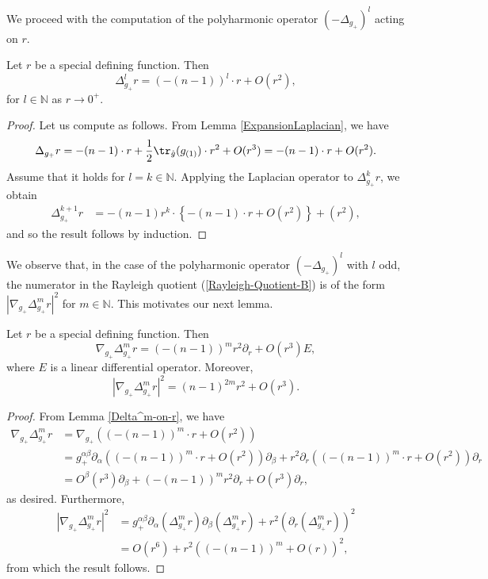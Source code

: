 \documentclass{amsart}
\newcommand{\A}{\alpha}
\newcommand{\B}{\beta}
\begin{document}
We proceed with the computation of the polyharmonic operator $(-\Delta_{g_+})^l$ acting on $r$.

\begin{lemma}\label{Delta^m-on-r}
Let $r$ be a special defining function. Then
\begin{equation}
    \Delta^l_{g_+}r =(-(n-1))^l\cdot r +O(r^2),
\end{equation}
for $l\in \mathbb{N}$ as $r\to0^+$.
\end{lemma}

\begin{proof}
    Let us compute as follows. From Lemma \ref{ExpansionLaplacian}, we have
    \[
    \Delta_{g_+}r =-(n-1)\cdot r +\frac12\tr_{\hat g}(g_{(1)})\cdot r^2 + O(r^3) = -(n-1)\cdot r + O(r^2).
    \]
    Assume that it holds for $l=k\in\mathbb{N}$. Applying the Laplacian operator to $\Delta_{g_+}^kr$, we obtain
    \[
    \begin{split}
        \Delta^{k+1}_{g_+}r &= -(n-1)r^k\cdot \left\{-(n-1)\cdot r+ O(r^2)\right\} +(r^2),
    \end{split}
    \]
    and so the result follows by induction. 
\end{proof}

We observe that, in the case of the polyharmonic operator $(-\Delta_{g_+})^l$ with $l$ odd, the numerator in the Rayleigh quotient (\ref{Rayleigh-Quotient-B}) is of the form $|\nabla_{g_+}\Delta^m_{g_+}r|^2$ for $m\in\mathbb{N}$. This motivates our next lemma.
\begin{lemma}\label{Nabla-Delta^m-on-r}
    Let $r$ be a special defining function. Then 
    \begin{equation}
        \nabla_{g_+}\Delta^m_{g_+}r = (-(n-1))^mr^2\partial_r + O(r^3)E,
    \end{equation}
    where $E$ is a linear differential operator. Moreover,
    \begin{equation}
        |\nabla_{g_+}\Delta_{g_+}^mr|^2 = (n-1)^{2m}r^2 + O(r^3).
    \end{equation}
\end{lemma}

\begin{proof}
    From Lemma \ref{Delta^m-on-r}, we have
    \[
    \begin{split}
        \nabla_{g_+}\Delta^m_{g_+}r &= \nabla_{g_+}\left((-(n-1))^m\cdot r +O(r^2)\right) \\ &= g_+^{\A\B}\partial_\A((-(n-1))^m\cdot r +O(r^2))\partial_\B+r^2\partial_r((-(n-1))^m\cdot r +O(r^2))\partial_r \\&= O^\B(r^3)\partial_\B + (-(n-1))^m r^2\partial_r + O(r^3)\partial_r,
    \end{split}
    \]
    as desired. Furthermore, 
    \[
    \begin{split}
        |\nabla_{g_+}\Delta^m_{g_+}r|^2 &= g_+^{\A\B}\partial_\A(\Delta^m_{g_+}r)\partial_\B(\Delta^m_{g_+}r) + r^2(\partial_r(\Delta^m_{g_+}r))^2  \\ &= O(r^6) + r^2((-(n-1))^{m}+ O(r))^2,
    \end{split}
    \]
    from which the result follows. 
\end{proof}
\end{document}
